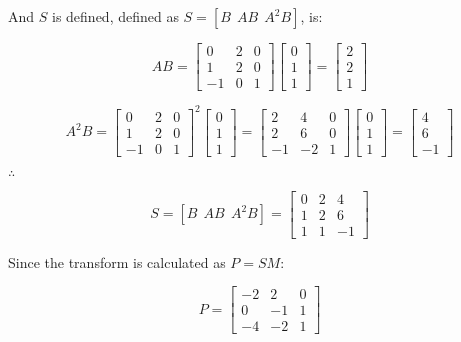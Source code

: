 \documentclass[12pt, letterpaper]{../assignment}
\begin{document}
And $S$ is defined, defined as $ S = [B \ \ AB \ \ A^2 B]$, is:

$$ AB = \left[\begin{array}{ccc} 0 & 2 & 0 \\ 1 & 2 & 0 \\ -1 & 0 & 1 \end{array}\right]
\left[\begin{array}{c} 0 \\ 1\\ 1 \end{array}\right] =  \left[\begin{array}{c} 2 \\ 2\\ 1 \end{array}\right]
$$

$$ A^2 B = \left[\begin{array}{ccc} 0 & 2 & 0 \\ 1 & 2 & 0 \\ -1 & 0 & 1 \end{array}\right]^2
\left[\begin{array}{c} 0 \\ 1\\ 1 \end{array}\right] = 
\left[\begin{array}{ccc} 2 & 4 & 0 \\ 2 & 6 & 0 \\ -1 & -2 & 1 \end{array}\right]
\left[\begin{array}{c} 0 \\ 1\\ 1 \end{array}\right] = \left[\begin{array}{c} 4 \\ 6\\ -1 \end{array}\right]
$$

$\therefore$

$$ S = [B\ \ AB\ \ A^2 B] = \left[\begin{array}{ccc} 0 & 2 & 4 \\ 1 & 2 & 6 \\ 1 & 1 & -1 \end{array}\right] $$

Since the transform is calculated as $P = S M $:

\begin{answer}
  $$  P = \left[\begin{array}{ccc} -2 & 2 & 0 \\ 0 & -1 & 1 \\ -4 & -2 & 1 \end{array}\right] $$
\end{answer}
\end{document}
